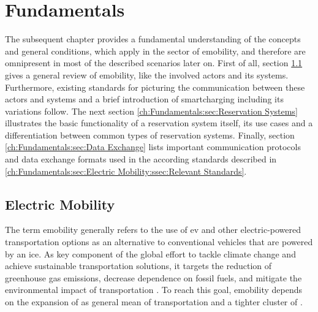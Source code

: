 

\chapter{Fundamentals}
\label{ch:Fundamentals}

The subsequent chapter provides a fundamental understanding of the concepts and general conditions, which apply in the sector of \gls{emobility}, and therefore are omnipresent in most of the described scenarios later on.
First of all, section \ref{ch:Fundamentals:sec:Electric Mobility} gives a general review of \gls{emobility}, like the involved actors and its systems. Furthermore, existing standards for picturing the communication between these actors and systems and a brief introduction of \gls{smartcharging} including its variations follow.
The next section \ref{ch:Fundamentals:sec:Reservation Systems} illustrates the basic functionality of a reservation system itself, its use cases and a differentiation between common types of reservation systems.
Finally, section \ref{ch:Fundamentals:sec:Data Exchange} lists important communication protocols and data exchange formats used in the according standards described in \ref{ch:Fundamentals:sec:Electric Mobility:ssec:Relevant Standards}.

\section{Electric Mobility}
\label{ch:Fundamentals:sec:Electric Mobility}

The term \Gls{emobility} generally refers to the use of \acrfull{ev} and other electric-powered transportation options as an alternative to conventional vehicles that are powered by an \acrfull{ice}. 
As key component of the global effort to tackle climate change and achieve sustainable transportation solutions, it targets the reduction of greenhouse gas emissions, decrease dependence on fossil fuels, and mitigate the environmental impact of transportation \cite{kathiresh_e-mobility_2022}.
To reach this goal, \Gls{emobility} depends on the expansion of  as general mean of transportation and a tighter cluster of .

